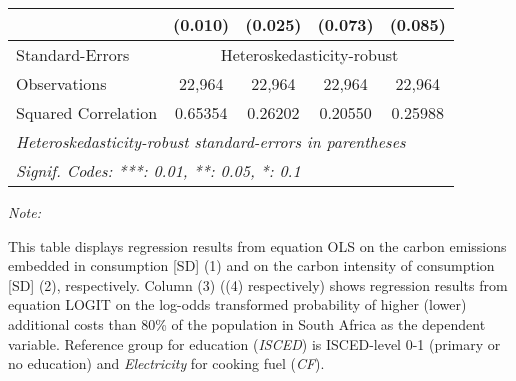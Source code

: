 \begin{table}[htbp!]
\begin{adjustbox}{width = 1\textwidth, max height = 0.95\textheight, center}
\begin{threeparttable}[b]
\begin{tabular}{lcccc}
                                 & (0.010)            & (0.025)            & (0.073)        & (0.085)\\   
            \midrule 
            Standard-Errors & \multicolumn{4}{c}{Heteroskedasticity-robust} \\ 
            Observations         & 22,964             & 22,964             & 22,964         & 22,964\\  
            Squared Correlation  & 0.65354            & 0.26202            & 0.20550        & 0.25988\\  
            \midrule \midrule
            \multicolumn{5}{l}{\emph{Heteroskedasticity-robust standard-errors in parentheses}}\\
            \multicolumn{5}{l}{\emph{Signif. Codes: ***: 0.01, **: 0.05, *: 0.1}}\\
         \end{tabular}
         
         \begin{tablenotes}\item \medskip \textit{Note:}
            \item This table displays regression results from equation OLS on the carbon emissions embedded in consumption [SD] (1) and on the carbon intensity of consumption [SD] (2), respectively. 
                                      Column (3) ((4) respectively) shows regression results from equation LOGIT on the log-odds transformed probability of higher (lower) additional costs than 80\% of the population in South Africa as the dependent variable. Reference group for education (\textit{ISCED}) is ISCED-level 0-1 (primary or no education) and \textit{Electricity} for cooking fuel (\textit{CF}).
         \end{tablenotes}
      \end{threeparttable}
   \end{adjustbox}
\end{table}


